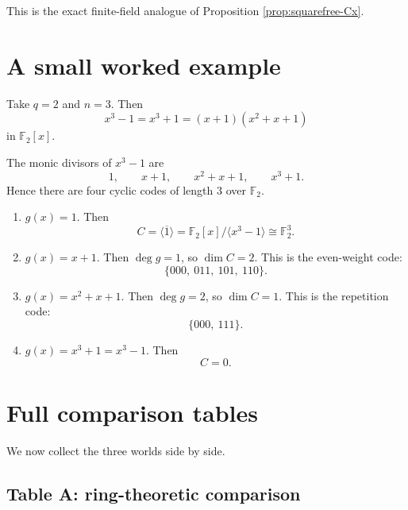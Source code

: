 \documentclass[11pt]{article}
\theoremstyle{definition}
\newcommand{\F}{\mathbb{F}}
\newcommand{\ideal}[1]{\langle #1\rangle}
\newcommand{\ol}[1]{\overline{#1}}
\begin{document}
	This is the exact finite-field analogue of Proposition \ref{prop:squarefree-Cx}.
	
	\section{A small worked example}
	
	Take \(q=2\) and \(n=3\). Then
	\[
	x^3-1=x^3+1=(x+1)(x^2+x+1)
	\]
	in \(\F_2[x]\).
	
	The monic divisors of \(x^3-1\) are
	\[
	1,\qquad x+1,\qquad x^2+x+1,\qquad x^3+1.
	\]
	Hence there are four cyclic codes of length \(3\) over \(\F_2\).
	
	\begin{enumerate}[label=\textbf{(\arabic*)}]
		\item \(g(x)=1\). Then
		\[
		C=\ideal{\ol{1}}=\F_2[x]/\ideal{x^3-1}\cong \F_2^3.
		\]
		
		\item \(g(x)=x+1\). Then \(\deg g=1\), so \(\dim C=2\). This is the even-weight code:
		\[
		\{000,\ 011,\ 101,\ 110\}.
		\]
		
		\item \(g(x)=x^2+x+1\). Then \(\deg g=2\), so \(\dim C=1\). This is the repetition code:
		\[
		\{000,\ 111\}.
		\]
		
		\item \(g(x)=x^3+1=x^3-1\). Then
		\[
		C=0.
		\]
	\end{enumerate}
	
	\section{Full comparison tables}
	
	We now collect the three worlds side by side.
	
	\subsection*{Table A: ring-theoretic comparison}
	
\end{document}
